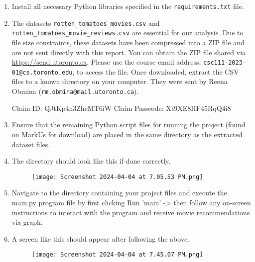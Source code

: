 \documentclass[fontsize=11pt]{article}
\begin{document}
\begin{enumerate}
    \item Install all necessary Python libraries specified in the \texttt{requirements.txt} file.

    \item The datasets \texttt{rotten\_tomatoes\_movies.csv} and \texttt{rotten\_tomatoes\_movie\_reviews.csv} are essential for our analysis. Due to file size constraints, these datasets have been compressed into a ZIP file and are not sent directly with this report. You can obtain the ZIP file shared via \url{https://send.utoronto.ca}. Please use the course email address, \texttt{csc111-2023-01@cs.toronto.edu}, to access the file. Once downloaded, extract the CSV files to a known directory on your computer. They were sent by Reena Obmina 
    (\texttt{rm.obmina@mail.utoronto.ca}). 
    
    \vspace{0.5cm}
    Claim ID: QJtKp4n3ZheMT6iW Claim Passcode: Xt9XE8HF45RqQ4i8
    
    \item Ensure that the remaining Python script files for running the project (found on MarkUs for download) are placed in the same directory as the extracted dataset files. 

    \item The directory should look like this if done correctly.

\begin{figure}[H] %
    \centering
    \texttt{[image: Screenshot 2024-04-04 at 7.05.53 PM.png]} %
    \label{fig:dir-structure} %
\end{figure}

    \item Navigate to the directory containing your project files and execute the main.py program file by first clicking Run 'main' -\textgreater{} then follow any on-screen instructions to interact with the program and receive movie recommendations via graph.

    \item A screen like this should appear after following the above.

\begin{figure}[H] %
    \centering
    \texttt{[image: Screenshot 2024-04-04 at 7.45.07 PM.png]} %
    \label{fig:dir-structure} %
\end{figure}

\end{enumerate}
\end{document}
